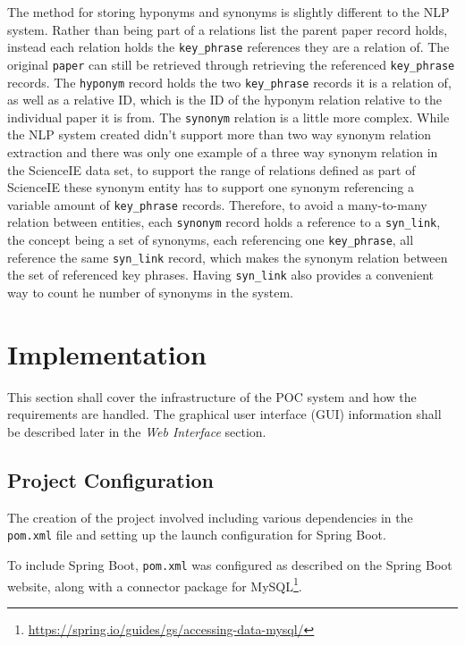 The method for storing hyponyms and synonyms is slightly different to the NLP system. Rather than being part of a relations list the parent paper record holds, instead each relation holds the \texttt{key\_phrase} references they are a relation of. The original \texttt{paper} can still be retrieved through retrieving the referenced \texttt{key\_phrase} records. The \texttt{hyponym} record holds the two \texttt{key\_phrase} records it is a relation of, as well as a relative ID, which is the ID of the hyponym relation relative to the individual paper it is from. The \texttt{synonym} relation is a little more complex. While the NLP system created didn't support more than two way synonym relation extraction and there was only one example of a three way synonym relation in the ScienceIE data set, to support the range of relations defined as part of ScienceIE these synonym entity has to support one synonym referencing a variable amount of \texttt{key\_phrase} records. Therefore, to avoid a many-to-many relation between entities, each \texttt{synonym} record holds a reference to a \texttt{syn\_link}, the concept being a set of synonyms, each referencing one \texttt{key\_phrase}, all reference the same \texttt{syn\_link} record, which makes the synonym relation between the set of referenced key phrases. Having \texttt{syn\_link} also provides a convenient way to count he number of synonyms in the system.

\section{Implementation}
This section shall cover the infrastructure of the POC system and how the requirements are handled. The graphical user interface (GUI) information shall be described later in the \textit{Web Interface} section.

\subsection*{Project Configuration}
The creation of the project involved including various dependencies in the \texttt{pom.xml} file and setting up the launch configuration for Spring Boot.

To include Spring Boot, \texttt{pom.xml} was configured as described on the Spring Boot website, along with a connector package for MySQL\footnote{\href{https://spring.io/guides/gs/accessing-data-mysql/}{https://spring.io/guides/gs/accessing-data-mysql/}}. 

